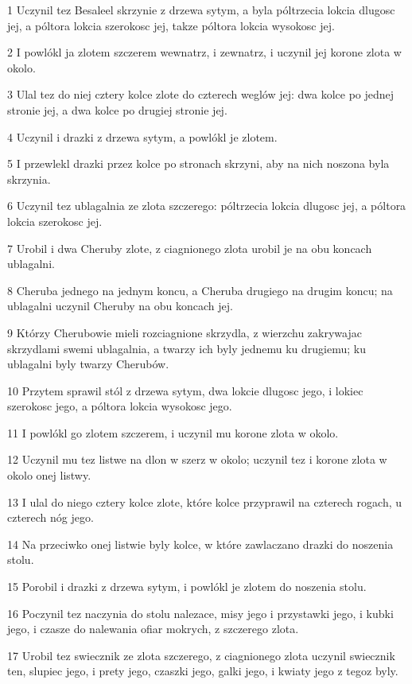 \par 1 Uczynil tez Besaleel skrzynie z drzewa sytym, a byla póltrzecia lokcia dlugosc jej, a póltora lokcia szerokosc jej, takze póltora lokcia wysokosc jej.
\par 2 I powlókl ja zlotem szczerem wewnatrz, i zewnatrz, i uczynil jej korone zlota w okolo.
\par 3 Ulal tez do niej cztery kolce zlote do czterech weglów jej: dwa kolce po jednej stronie jej, a dwa kolce po drugiej stronie jej.
\par 4 Uczynil i drazki z drzewa sytym, a powlókl je zlotem.
\par 5 I przewlekl drazki przez kolce po stronach skrzyni, aby na nich noszona byla skrzynia.
\par 6 Uczynil tez ublagalnia ze zlota szczerego: póltrzecia lokcia dlugosc jej, a póltora lokcia szerokosc jej.
\par 7 Urobil i dwa Cheruby zlote, z ciagnionego zlota urobil je na obu koncach ublagalni.
\par 8 Cheruba jednego na jednym koncu, a Cheruba drugiego na drugim koncu; na ublagalni uczynil Cheruby na obu koncach jej.
\par 9 Którzy Cherubowie mieli rozciagnione skrzydla, z wierzchu zakrywajac skrzydlami swemi ublagalnia, a twarzy ich byly jednemu ku drugiemu; ku ublagalni byly twarzy Cherubów.
\par 10 Przytem sprawil stól z drzewa sytym, dwa lokcie dlugosc jego, i lokiec szerokosc jego, a póltora lokcia wysokosc jego.
\par 11 I powlókl go zlotem szczerem, i uczynil mu korone zlota w okolo.
\par 12 Uczynil mu tez listwe na dlon w szerz w okolo; uczynil tez i korone zlota w okolo onej listwy.
\par 13 I ulal do niego cztery kolce zlote, które kolce przyprawil na czterech rogach, u czterech nóg jego.
\par 14 Na przeciwko onej listwie byly kolce, w które zawlaczano drazki do noszenia stolu.
\par 15 Porobil i drazki z drzewa sytym, i powlókl je zlotem do noszenia stolu.
\par 16 Poczynil tez naczynia do stolu nalezace, misy jego i przystawki jego, i kubki jego, i czasze do nalewania ofiar mokrych, z szczerego zlota.
\par 17 Urobil tez swiecznik ze zlota szczerego, z ciagnionego zlota uczynil swiecznik ten, slupiec jego, i prety jego, czaszki jego, galki jego, i kwiaty jego z tegoz byly.
